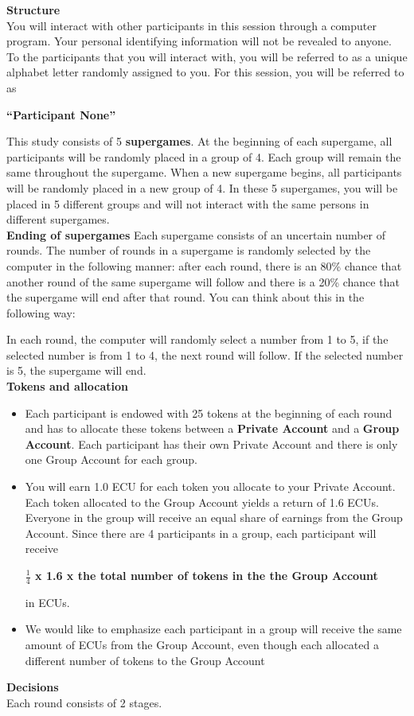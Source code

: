 \documentclass[12pt,letterpaper,english]{article}
\begin{document}
\textbf{Structure}\\
You will interact with other participants in this session through a computer program. Your personal identifying information will not be revealed to anyone. To the participants that you will interact with, you will be referred to as a unique alphabet letter randomly assigned to you. For this session, you will be referred to as

\begin{center}
    \textbf{“Participant None”}
\end{center}

This study consists of 5 \textbf{supergames}. At the beginning of each supergame, all participants will be randomly placed in a group of 4. Each group will remain the same throughout the supergame. When a new supergame begins, all participants will be randomly placed in a new group of 4. In these 5 supergames, you will be placed in 5 different groups and will not interact with the same persons in different supergames.\\
\textbf{Ending of supergames}
Each supergame consists of an uncertain number of rounds. The number of rounds in a supergame is randomly selected by the computer in the following manner: after each round, there is an 80\% chance that another round of the same supergame will follow and there is a 20\% chance that the supergame will end after that round. You can think about this in the following way:



In each round, the computer will randomly select a number from 1 to 5, if the selected number is from 1 to 4, the next round will follow. If the selected number is 5, the supergame will end.\\

\textbf{Tokens and allocation}
\begin{itemize}
    \item Each participant is endowed with 25 tokens at the beginning of each round and has to allocate these tokens between a \textbf{Private Account} and a \textbf{Group Account}. Each participant has their own Private Account and there is only one Group Account for each group.
\item You will earn 1.0 ECU for each token you allocate to your Private Account. Each token allocated to the Group Account yields a return of 1.6 ECUs. Everyone in the group will receive an equal share of earnings from the Group Account. Since there are 4 participants in a group, each participant will receive

\begin{center}
    \textbf{$\frac{1}{4}$ x 1.6 x the total number of tokens in the the Group Account}
\end{center}

in ECUs.

\item We would like to emphasize each participant in a group will receive the same amount of ECUs from the Group Account, even though each allocated a different number of tokens to the Group Account
\end{itemize}
\textbf{Decisions}\\
Each round consists of 2 stages.
\end{document}

